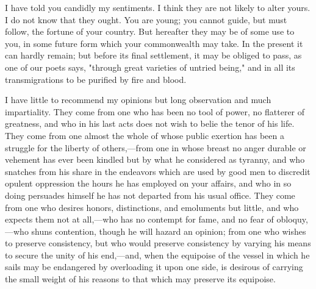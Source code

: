 I have told you candidly my sentiments. I think they are not likely to alter yours. I do not know that they ought. You are young; you cannot guide, but must follow, the fortune of your country. But hereafter they may be of some use to you, in some future form which your commonwealth may take. In the present it can hardly remain; but before its final settlement, it may be obliged to pass, as one of our poets says, "through great varieties of untried being," and in all its transmigrations to be purified by fire and blood.

I have little to recommend my opinions but long observation and much impartiality. They come from one who has been no tool of power, no flatterer of greatness, and who in his last acts does not wish to belie the tenor of his life. They come from one almost the whole of whose public exertion has been a struggle for the liberty of others,—from one in whose breast no anger durable or vehement has ever been kindled but by what he considered as tyranny, and who snatches from his share in the endeavors which are used by good men to discredit opulent oppression the hours he has employed on your affairs, and who in so doing persuades himself he has not departed from his usual office. They come from one who desires honors, distinctions, and emoluments but little, and who expects them not at all,—who has no contempt for fame, and no fear of obloquy,—who shuns contention, though he will hazard an opinion; from one who wishes to preserve consistency, but who would preserve consistency by varying his means to secure the unity of his end,—and, when the equipoise of the vessel in which he sails may be endangered by overloading it upon one side, is desirous of carrying the small weight of his reasons to that which may preserve its equipoise.






